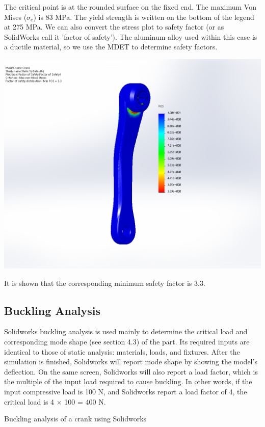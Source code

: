 \documentclass[a4paper,openany,12pt]{book}
\begin{document}
{{The critical point is at the rounded surface on the fixed end. The
maximum Von Mises (\(\sigma_e\)) is 83 MPa. The yield strength is written
on the bottom of the legend at 275 MPa. We can also convert the stress
plot to safety factor (or as SolidWorks call it 'factor of safety'). The
aluminum alloy used within this case is a ductile material, so we use
the MDET to determine safety factors.


\begin{center}
\includegraphics[width=.9\linewidth]{pictures/Intro-CAD/Crank-safety-factor.png}
\end{center}

It is shown that the corresponding minimum safety factor is 3.3.

\subsection{Buckling Analysis}
\label{sec:org077d450}
Solidworks buckling analysis is used mainly to determine the critical
load and corresponding mode shape (see section 4.3) of the part. Its
required inputs are identical to those of static analysis: materials,
loads, and fixtures. After the simulation is finished, Solidworks will
report mode shape by showing the model's deflection. On the same screen,
Solidworks will also report a load factor, which is the multiple of the
input load required to cause buckling. In other words, if the input
compressive load is 100 N, and Solidworks report a load factor of 4, the
critical load is 4 \(\times\) 100 = 400 N.

Buckling analysis of a crank using Solidworks

}}
\end{document}
